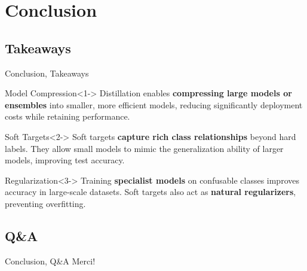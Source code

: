 \documentclass[aspectratio=1610]{beamer}
\begin{document}
    \section*{Conclusion}
    \subsection*{Takeaways}
    \begin{frame}{Conclusion, Takeaways}
        \begin{alertblock}{Model Compression}<1->
            Distillation enables \textbf{compressing large models or ensembles} into smaller, more efficient models, reducing significantly deployment costs while retaining performance.
        \end{alertblock}

        \begin{alertblock}{Soft Targets}<2->
            Soft targets \textbf{capture rich class relationships} beyond hard labels. They allow small models to mimic the generalization ability of larger models, improving test accuracy.
        \end{alertblock}

        \begin{alertblock}{Regularization}<3->
            Training \textbf{specialist models} on confusable classes improves accuracy in large-scale datasets. Soft targets also act as \textbf{natural regularizers}, preventing overfitting.
        \end{alertblock}
    \end{frame}

    \subsection*{Q\&A}
    \begin{frame}{Conclusion, Q\&A}
        \centering
        \Huge{Merci!}
    \end{frame}

    \maketitle
\end{document}
